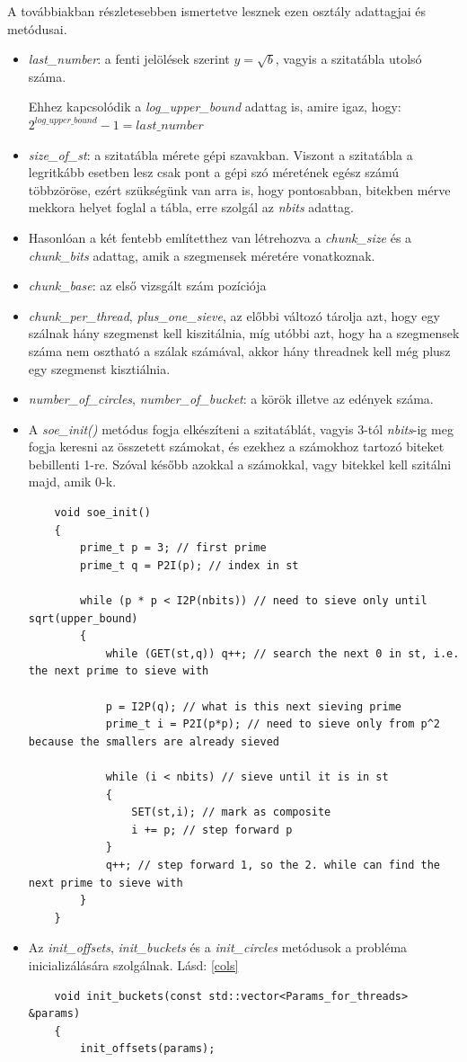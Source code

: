 \documentclass[twoside, a4paper, 12pt]{article}
\begin{document}
A továbbiakban részletesebben ismertetve lesznek ezen osztály adattagjai és metódusai.
\begin{itemize}
\item \textit{last\_number}: a fenti jelölések szerint $y=\sqrt{b}$, vagyis a szitatábla utolsó száma. \par Ehhez kapcsolódik a \textit{log\_upper\_bound} adattag is, amire igaz, hogy: 
\( 2^{log\_upper\_bound}-1=last\_number \)
\item \textit{size\_of\_st}: a szitatábla mérete gépi szavakban. Viszont a szitatábla a legritkább esetben lesz csak pont a gépi szó méretének egész számú többzöröse, ezért szükségünk van arra is, hogy pontosabban, bitekben mérve mekkora helyet foglal a tábla, erre szolgál az \textit{nbits} adattag.
\item Hasonlóan a két fentebb említetthez van létrehozva a \textit{chunk\_size} és a \textit{chunk\_bits} adattag, amik a szegmensek méretére vonatkoznak.
\item \textit{chunk\_base}: az első vizsgált szám pozíciója
\item \textit{chunk\_per\_thread}, \textit{plus\_one\_sieve}, az előbbi változó tárolja azt, hogy egy szálnak hány szegmenst kell kiszitálnia, míg utóbbi azt, hogy ha a szegmensek száma nem osztható a szálak számával, akkor hány threadnek kell még plusz egy szegmenst kisztiálnia.
\item \textit{number\_of\_circles}, \textit{number\_of\_bucket}: a körök illetve az edények száma.
\bigskip\bigskip\bigskip
\item A \textit{soe\_init()} metódus fogja elkészíteni a szitatáblát, vagyis 3-tól \textit{nbits}-ig meg fogja keresni az összetett számokat, és ezekhez a számokhoz tartozó biteket bebillenti 1-re. Szóval később azokkal a számokkal, vagy bitekkel kell szitálni majd, amik 0-k.
\begin{lstlisting}
	void soe_init()
	{
		prime_t p = 3; // first prime
		prime_t q = P2I(p); // index in st

		while (p * p < I2P(nbits)) // need to sieve only until sqrt(upper_bound)
		{
			while (GET(st,q)) q++; // search the next 0 in st, i.e. the next prime to sieve with

			p = I2P(q); // what is this next sieving prime
			prime_t i = P2I(p*p); // need to sieve only from p^2 because the smallers are already sieved

			while (i < nbits) // sieve until it is in st
			{
				SET(st,i); // mark as composite
				i += p; // step forward p
			}
			q++; // step forward 1, so the 2. while can find the next prime to sieve with
		}
	} 
\end{lstlisting}
\item Az \textit{init\_offsets}, \textit{init\_buckets} és a \textit{init\_circles} metódusok a probléma inicializálására szolgálnak. Lásd: \ref{cols}
\begin{lstlisting}
	void init_buckets(const std::vector<Params_for_threads> &params)
	{
		init_offsets(params);
	

\end{lstlisting}
\end{itemize}
\end{document}
